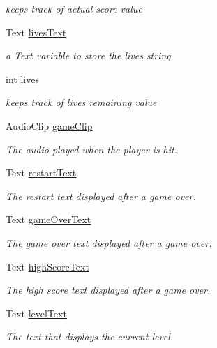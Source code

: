 \begin{DoxyCompactItemize}
\begin{DoxyCompactList}\small\item\em keeps track of actual score value \end{DoxyCompactList}\item 
Text \mbox{\hyperlink{class_player_controller_a4693ac0aaa4ce93171a7b58a4b7d8117}{lives\+Text}}
\begin{DoxyCompactList}\small\item\em a Text variable to store the lives string \end{DoxyCompactList}\item 
int \mbox{\hyperlink{class_player_controller_a011e869f64df3168d919fa6f41d58614}{lives}}
\begin{DoxyCompactList}\small\item\em keeps track of lives remaining value \end{DoxyCompactList}\item 
Audio\+Clip \mbox{\hyperlink{class_player_controller_a6206943367033fb9307accaf27f9a1ef}{game\+Clip}}
\begin{DoxyCompactList}\small\item\em The audio played when the player is hit. \end{DoxyCompactList}\item 
Text \mbox{\hyperlink{class_player_controller_a5dacc07bd5240b4d30337caeb89d6e02}{restart\+Text}}
\begin{DoxyCompactList}\small\item\em The restart text displayed after a game over. \end{DoxyCompactList}\item 
Text \mbox{\hyperlink{class_player_controller_ad22c814018c51eab731676920276c38d}{game\+Over\+Text}}
\begin{DoxyCompactList}\small\item\em The game over text displayed after a game over. \end{DoxyCompactList}\item 
Text \mbox{\hyperlink{class_player_controller_a5a16f1a71fa4ce1002d8aebbcec0514b}{high\+Score\+Text}}
\begin{DoxyCompactList}\small\item\em The high score text displayed after a game over. \end{DoxyCompactList}\item 
Text \mbox{\hyperlink{class_player_controller_aa9db6bb729491dad366bc5237b2a4b2e}{level\+Text}}
\begin{DoxyCompactList}\small\item\em The text that displays the current level. \end{DoxyCompactList}\item 

\end{DoxyCompactItemize}
